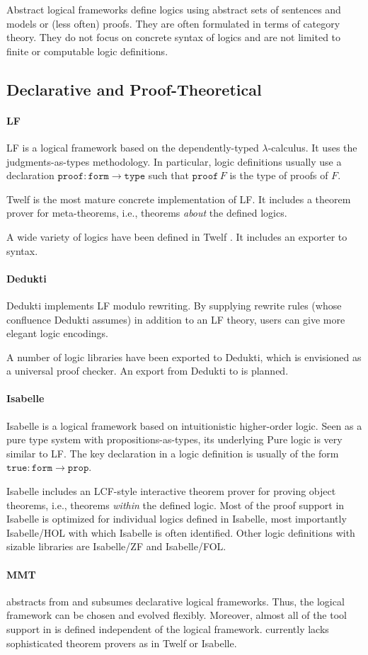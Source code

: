 \documentclass[12pt]{article}
\newcommand{\system}[2][]{\paragraph{#2}#2 \ifnonempty[\cite{#2}]{#1}{\cite{#1}}}
\begin{document}
Abstract logical frameworks define logics using abstract sets of sentences and models or (less often) proofs.
They are often formulated in terms of category theory.
They do not focus on concrete syntax of logics and are not limited to finite or computable logic definitions.

\subsection{Declarative and Proof-Theoretical}

\system{LF} is a logical framework based on the dependently-typed $\lambda$-calculus.
It uses the judgments-as-types methodology.
In particular, logic definitions usually use a declaration $\mathtt{proof}:\mathtt{form}\to\mathtt{type}$ such that $\mathtt{proof}\,F$ is the type of proofs of $F$.

Twelf \cite{twelf} is the most mature concrete implementation of LF.
It includes a theorem prover for meta-theorems, i.e., theorems \emph{about} the defined logics.

A wide variety of logics have been defined in Twelf \cite{CHKMR:latinabs:11}.
It includes an exporter to \mmt syntax.

\system{Dedukti} implements LF modulo rewriting.
By supplying rewrite rules (whose confluence Dedukti assumes) in addition to an LF theory, users can give more elegant logic encodings.

A number of logic libraries have been exported to Dedukti, which is envisioned as a universal proof checker.
An export from Dedukti to \mmt is planned.

\system{Isabelle} is a logical framework based on intuitionistic higher-order logic.
Seen as a pure type system \cite{tps} with propositions-as-types, its underlying Pure logic is very similar to LF.
The key declaration in a logic definition is usually of the form $\mathtt{true}:\mathtt{form}\to\mathtt{prop}$.

Isabelle includes an LCF-style interactive theorem prover for proving object theorems, i.e., theorems \emph{within} the defined logic.
Most of the proof support in Isabelle is optimized for individual logics defined in Isabelle, most importantly Isabelle/HOL with which Isabelle is often identified.
Other logic definitions with sizable libraries are Isabelle/ZF and Isabelle/FOL.

\paragraph{MMT}
\mmt abstracts from and subsumes declarative logical frameworks.
Thus, the logical framework can be chosen and evolved flexibly.
Moreover, almost all of the tool support in \mmt is defined independent of the logical framework.
\mmt currently lacks sophisticated theorem provers as in Twelf or Isabelle.
\end{document}
